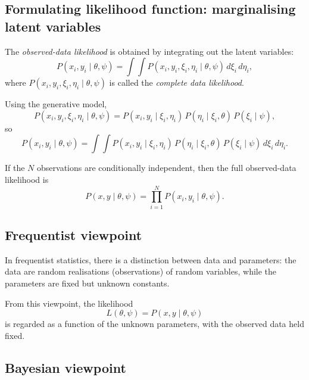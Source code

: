 \documentclass[11pt, titlepage]{article} %
\numberwithin{equation}{section}
\theoremstyle{definition}
\numberwithin{assumption}{section}
\begin{document}
\subsection{Formulating likelihood function: marginalising latent variables}

The \textit{observed-data likelihood} is obtained by integrating out the latent variables:
\begin{equation*}
    P(x_i,y_i\mid \theta,\psi)
    =
    \int\!\!\int
    P(x_i,y_i,\xi_i,\eta_i\mid \theta,\psi)\,d\xi_i\,d\eta_i,
\end{equation*}
where $P(x_i,y_i,\xi_i,\eta_i\mid \theta,\psi)$ is called the \textit{complete data likelihood}.

Using the generative model,
\begin{equation*}
    P(x_i,y_i,\xi_i,\eta_i\mid \theta,\psi)
    =
    P(x_i,y_i\mid \xi_i,\eta_i)\,
    P(\eta_i\mid \xi_i,\theta)\,
    P(\xi_i\mid \psi),
\end{equation*}
so
\begin{equation*}
    P(x_i,y_i\mid \theta,\psi)
    =
    \int\!\!\int
    P(x_i,y_i\mid \xi_i,\eta_i)\,
    P(\eta_i\mid \xi_i,\theta)\,
    P(\xi_i\mid \psi)\,d\xi_i\,d\eta_i.
\end{equation*}

If the $N$ observations are conditionally independent, then the full observed-data likelihood is
\begin{equation*}
    P(x,y\mid \theta,\psi)
    =
    \prod_{i=1}^N P(x_i,y_i\mid \theta,\psi).
\end{equation*}



\subsection{Frequentist viewpoint}

In frequentist statistics, there is a distinction between data and parameters: the data are random realisations (observations) of random variables, while the parameters are fixed but unknown constants.


From this viewpoint, the likelihood
\begin{equation*}
    L(\theta,\psi)=P(x,y\mid \theta,\psi)
\end{equation*}
is regarded as a function of the unknown parameters, with the observed data held fixed.


\subsection{Bayesian viewpoint}
\end{document}
